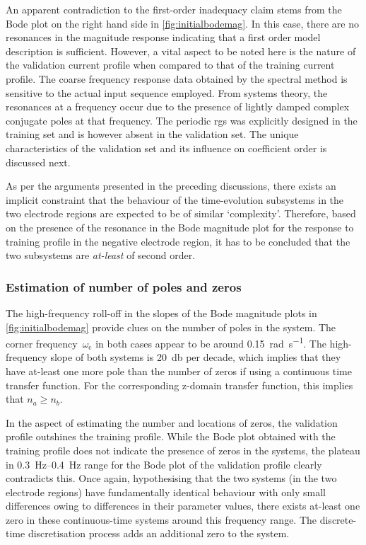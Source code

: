 An apparent  contradiction to  the first-order inadequacy  claim stems  from the
Bode plot  on the  right hand side  in \cref{fig:initialbodemag}. In  this case,
there are no resonances in the  magnitude response indicating that a first order
model description is sufficient. However, a vital aspect to be noted here is the
nature of the  validation current profile when compared to  that of the training
current profile.  The coarse  frequency response data  obtained by  the spectral
method is sensitive to the actual  input sequence employed. From systems theory,
the  resonances at  a frequency  occur  due to  the presence  of lightly  damped
complex conjugate poles at that frequency. The periodic \gls{rgs} was explicitly
designed in the  training set and is  however absent in the  validation set. The
unique characteristics  of the validation  set and its influence  on coefficient
order is discussed next.

As per  the arguments presented  in the  preceding discussions, there  exists an
implicit constraint that  the behaviour of the time-evolution  subsystems in the
two electrode  regions are  expected to be  of similar  `complexity'. Therefore,
based  on the  presence of  the resonance  in the  Bode magnitude  plot for  the
response to  training profile  in the  negative electrode region,  it has  to be
concluded that the two subsystems are \emph{at-least} of second order.

\subsubsection*{Estimation of number of poles and zeros}

The  high-frequency  roll-off  in  the   slopes  of  the  Bode  magnitude  plots
in \cref{fig:initialbodemag} provide clues on the number of poles in the system.
The  corner  frequency~$\omega_\text{c}$  in  both  cases  appear to  be  around
\SI{0.15}{\radian\per\second}.  The  high-frequency  slope of  both  systems  is
\approx\SI{20}{\decibel} per decade,  which implies that they  have at-least one
more pole than the number of zeros if using a continuous time transfer function.
For the  corresponding z-domain  transfer function, this  implies that  $n_a \ge
n_b$.

In the  aspect of estimating the  number and locations of  zeros, the validation
profile outshines  the training profile. While  the Bode plot obtained  with the
training profile  does not indicate  the presence of  zeros in the  systems, the
plateau in \SIrange{0.3}{0.4}{\hertz} range for  the Bode plot of the validation
profile clearly contradicts this. Once again, hypothesising that the two systems
(in the two electrode regions)  have fundamentally identical behaviour with only
small differences owing  to differences in their parameter  values, there exists
at-least one zero in these  continuous-time systems around this frequency range.
The discrete-time discretisation process adds an additional zero to the system.

